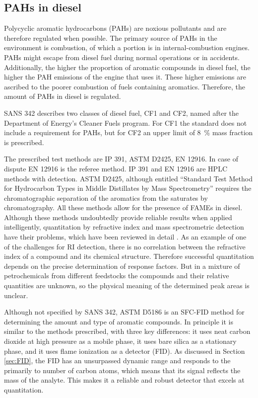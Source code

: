 \subsection{PAHs in diesel} 

Polycyclic aromatic hydrocarbons (PAHs) are noxious pollutants and are therefore
regulated when possible. The primary source of PAHs in the environment is
combustion, of which a portion is in internal-combustion engines.  PAHs might
escape from diesel fuel during normal operations or in accidents. Additionally,
the higher the proportion of aromatic compounds in diesel fuel, the higher the
PAH emissions of the engine that uses it. These higher emissions are ascribed to
the poorer combustion of fuels containing aromatics. Therefore, the amount of
PAHs in diesel is regulated.

SANS 342 describes two classes of diesel fuel, CF1 and CF2, named after the
Department of Energy's Cleaner Fuels program. For CF1 the standard does not
include a requirement for PAHs, but for CF2 an upper limit of \SI{8}{\percent}
mass fraction is prescribed.

The prescribed test methods are IP 391, ASTM D2425, EN 12916. In case of dispute
EN 12916 is the referee method. IP 391 and  EN 12916 are HPLC methods with
 detection. ASTM D2425, although entitled ``Standard
Test Method for Hydrocarbon Types in Middle Distillates by Mass Spectrometry''
requires the chromatographic separation of the aromatics from the saturates by
chromatography. All these methods allow for the presence of FAMEs in diesel.
Although these methods undoubtedly provide reliable results when applied
intelligently, quantitation by refractive index and mass spectrometric detection
have their problems, which have been reviewed in detail \autocite{Kaminski2005}.
As an example of one of the challenges for RI detection, there is no correlation
between the refractive index of a compound and its chemical structure. Therefore
successful quantitation depends on the precise determination of response
factors. But in a mixture of petrochemicals from different feedstocks the
compounds and their relative quantities are unknown, so the physical meaning of
the determined peak areas is unclear.


Although not specified by SANS 342, ASTM D5186 \autocite{ASTMD5186} is an
SFC-FID method for determining the amount and type of aromatic compounds. In
principle it is similar to the methods prescribed, with three key differences:
it uses neat carbon dioxide at high pressure as a mobile phase, it uses bare
silica as a stationary phase, and it uses flame ionization as a detector (FID).
As discussed in Section \ref{sec:FID}, the FID has an unsurpassed dynamic range
and responds to the primarily to number of carbon atoms, which means that its
signal reflects the mass of the analyte. This makes it a reliable and robust
detector that excels at quantitation.

